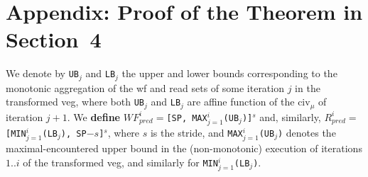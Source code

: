 \documentclass{sig-alternate}
\begin{document}
%

\begin{small}

\end{small}

\newpage

\section{Appendix: Proof of the Theorem in Section~4} %
\label{app:TheoremProof}

\begin{definition}
We denote by {\tt UB$_j$} and {\tt LB$_j$} the upper and lower bounds corresponding
to the monotonic aggregation of the {\sc wf} and {\sc read} sets of some iteration
$j$ in the transformed {\sc veg}, where both {\tt UB$_j$} and {\tt LB$_j$} are
affine function of the {\sc civ}$_\mu$ of iteration $j+1$.
We {\bf define} $WF_{pred}^{i} = ${\tt[SP, MAX$_{j=1}^{i}$(UB$_j$)]$^s$} and, similarly, 
$R_{pred}^{i} = ${\tt[MIN$_{j=1}^{i}$(LB$_j$), SP$-s$]$^s$}, where $s$ is the stride,
and {\tt MAX$_{j=1}^{i}$(UB$_j$)} denotes the maximal-encountered upper bound in the
(non-monotonic) execution of iterations $1 .. i$ of the transformed {\sc veg},
and similarly for {\tt MIN$_{j=1}^{i}$(LB$_j$)}.
\end{definition}
\end{document}
